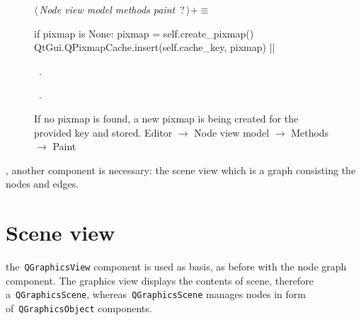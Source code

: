 \documentclass[%
    a4paper,    %
    justified,  %
    nobib,      %
    openany     %
]{tufte-book}
\makeatletter
\renewcommand{\label}[1]{\@tufte@label{##1}}%
\makeatother
\begin{document}
\begin{figure}
\begin{flushleft} \small
\begin{minipage}{\linewidth}\label{scrap80}\raggedright\small
{} $\langle\,${\itshape Node view model methods paint}\nobreak\ {\footnotesize {?}}$\,\rangle+\equiv$
\vspace{-1ex}
\begin{pythoncode}
if pixmap is None:
    pixmap = self.create_pixmap()
    QtGui.QPixmapCache.insert(self.cache_key, pixmap)
|\NWsep|
\end{pythoncode}
\vspace{1.5ex}
\footnotesize
\begin{list}{}{\setlength{\itemsep}{-\parsep}\setlength{\itemindent}{-\leftmargin}}
\item \NWtxtMacroDefBy\ .
\item \NWtxtMacroRefIn\ .

\item{}
\end{list}
\end{minipage}\vspace{4ex}
\end{flushleft}
\caption{If no pixmap is found, a new pixmap is being created for the provided
  key and stored.
  \newline{}\newline{}Editor $\rightarrow$ Node view model $\rightarrow$
  Methods $\rightarrow$ Paint}
\label{editor:lst:node-view-model:methods:paint:create-pixmap}
\end{figure}

, another component is necessary:
the scene view which is a graph consisting the nodes and edges.

\chapter{Scene view}
\label{appendix:chap:scene-view}

 the~\verb=QGraphicsView= component
is used as basis, as before with the node graph component. The graphics view
displays the contents of scene, therefore a~\verb=QGraphicsScene=,
whereas~\verb=QGraphicsScene= manages nodes in form of~\verb=QGraphicsObject=
components.
\end{document}
